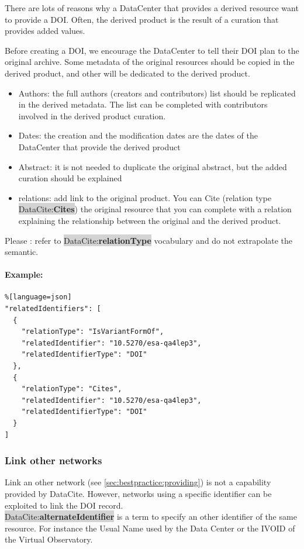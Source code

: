 \documentclass[11pt,a4paper]{ivoa}
\newcommand{\dataciteterm}[1]{\colorbox{lightgray}{DataCite:\textbf{#1}}}
\begin{document}
There are lots of reasons why a DataCenter that provides a derived resource want to provide a DOI. 
Often, the derived product is the result of a curation that provides added values.

Before creating a DOI, we encourage the DataCenter to tell their DOI plan to the original archive.
Some metadata of the original resources should be copied in the derived product, and other will be dedicated to the derived product.

\begin{itemize}
\item Authors: the full authors (creators and contributors) list should be replicated in the derived metadata. The list can be completed with contributors involved in the derived product curation.
\item Dates: the creation and the modification dates are the dates of the DataCenter that provide the derived product
\item Abstract: it is not needed to duplicate the original abstract, but the added curation should be explained
\item relations: add link to the original product. 
You can Cite (relation type \dataciteterm{Cites}) the original resource that you can complete with a relation explaining the relationship between the original and the derived product.
\end{itemize}

Please : refer to \dataciteterm{relationType} vocabulary and do not extrapolate the semantic.



\paragraph{Example:}
\begin{lstlisting}%[language=json]
"relatedIdentifiers": [
  {
    "relationType": "IsVariantFormOf",
    "relatedIdentifier": "10.5270/esa-qa4lep3",
    "relatedIdentifierType": "DOI"
  },
  {
    "relationType": "Cites",
    "relatedIdentifier": "10.5270/esa-qa4lep3",
    "relatedIdentifierType": "DOI"
  }
]
\end{lstlisting}

\subsubsection{Link other networks}
\label{sec:altidentifier}
Link an other network (see \ref{sec:bestpractice:providing}) is not a capability provided by DataCite.
However, networks using a specific identifier can be exploited to link the DOI record.\\
\dataciteterm{alternateIdentifier} is a term to specify an other identifier of the same resource. For instance the Usual Name used by the Data Center or the IVOID of the Virtual Observatory.
\end{document}
